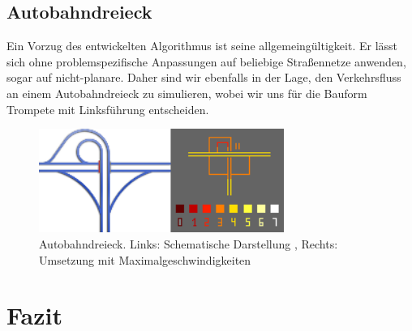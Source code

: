 \documentclass[11pt, a4paper]{article}
\newcommand\q[1]{\glqq{}#1\grqq{}}
\newcommand\myref[1]{\ref{#1} (S. \pageref{#1})}
\newcommand\myrefcomma[1]{\ref{#1}, S. \pageref{#1}}
\begin{document}
\subsection{Autobahndreieck}
Ein Vorzug des entwickelten Algorithmus ist seine allgemeingültigkeit. Er lässt sich ohne problemspezifische Anpassungen auf beliebige Straßennetze anwenden, sogar auf nicht-planare. Daher sind wir ebenfalls in der Lage, den Verkehrsfluss an einem Autobahndreieck zu simulieren, wobei wir uns für die Bauform \q{Trompete} mit Linksführung entscheiden.

\begin{figure}[h!]
	\centering
	\includegraphics[width=8cm]{img/interchangeTrumpetSpeedLimits}
	\caption{Autobahndreieck. Links: Schematische Darstellung \cite{wiki:trumpetInterchange}, Rechts: Umsetzung mit Maximalgeschwindigkeiten}
	\label{fig:interchangeTrumpet}
\end{figure}

\newpage
\section{Fazit}
\label{sec:fazit}


\newpage
{}
{}

\end{document}
